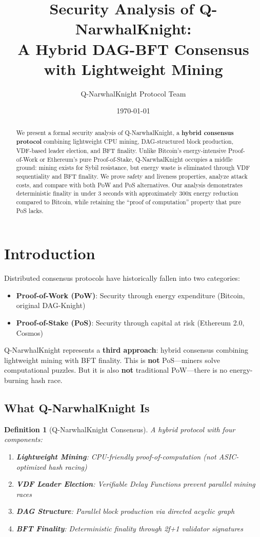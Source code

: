 \documentclass[11pt,a4paper]{article}
\title{Security Analysis of Q-NarwhalKnight:\\A Hybrid DAG-BFT Consensus with Lightweight Mining}
\author{Q-NarwhalKnight Protocol Team}
\date{\today}
\newtheorem{definition}[theorem]{Definition}
\begin{document}
\maketitle

\begin{abstract}
We present a formal security analysis of Q-NarwhalKnight, a \textbf{hybrid consensus protocol} combining lightweight CPU mining, DAG-structured block production, VDF-based leader election, and BFT finality. Unlike Bitcoin's energy-intensive Proof-of-Work or Ethereum's pure Proof-of-Stake, Q-NarwhalKnight occupies a middle ground: mining exists for Sybil resistance, but energy waste is eliminated through VDF sequentiality and BFT finality. We prove safety and liveness properties, analyze attack costs, and compare with both PoW and PoS alternatives. Our analysis demonstrates deterministic finality in under 3 seconds with approximately 300x energy reduction compared to Bitcoin, while retaining the ``proof of computation'' property that pure PoS lacks.
\end{abstract}

\section{Introduction}

Distributed consensus protocols have historically fallen into two categories:
\begin{itemize}
    \item \textbf{Proof-of-Work (PoW)}: Security through energy expenditure (Bitcoin, original DAG-Knight)
    \item \textbf{Proof-of-Stake (PoS)}: Security through capital at risk (Ethereum 2.0, Cosmos)
\end{itemize}

Q-NarwhalKnight represents a \textbf{third approach}: hybrid consensus combining lightweight mining with BFT finality. This is \textbf{not} PoS---miners solve computational puzzles. But it is also \textbf{not} traditional PoW---there is no energy-burning hash race.

\subsection{What Q-NarwhalKnight Is}

\begin{definition}[Q-NarwhalKnight Consensus]
A hybrid protocol with four components:
\begin{enumerate}
    \item \textbf{Lightweight Mining}: CPU-friendly proof-of-computation (not ASIC-optimized hash racing)
    \item \textbf{VDF Leader Election}: Verifiable Delay Functions prevent parallel mining races
    \item \textbf{DAG Structure}: Parallel block production via directed acyclic graph
    \item \textbf{BFT Finality}: Deterministic finality through 2f+1 validator signatures
\end{enumerate}
\end{definition}
\end{document}
